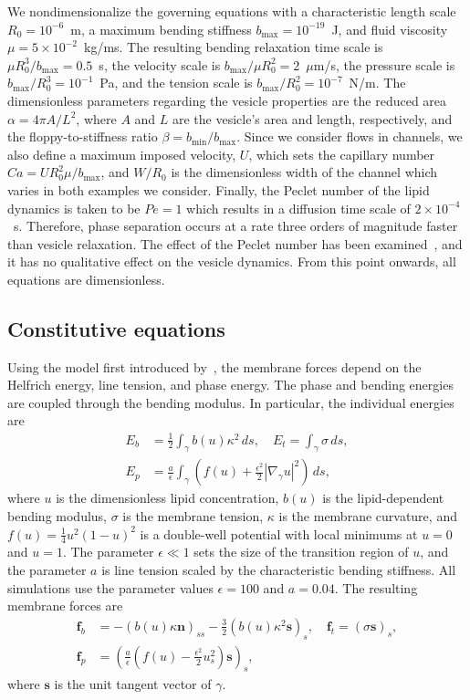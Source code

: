 \documentclass[twoside,twocolumn,9pt]{article}
\newcommand{\ff}{\mathbf{f}}
\newcommand{\nn}{\mathbf{n}}
\renewcommand{\ss}{\mathbf{s}}
\begin{document}
We nondimensionalize the governing equations with a characteristic
length scale $R_0 = 10^{-6}$~m, a maximum bending stiffness $b_{\max} =
10^{-19}$~J, and fluid viscosity $\mu = 5 \times 10^{-2}$~kg/ms. The
resulting bending relaxation time scale is $\mu R_0^3/b_{\max} = 0.5$~s,
the velocity scale is $b_{\max}/\mu R_0^2=2$~$\mu$m/s, the pressure
scale is $b_{\max}/R_0^3 = 10^{-1}$~Pa, and the tension scale is
$b_{\max}/R_0^2 = 10^{-7}$~N/m. The dimensionless parameters regarding
the vesicle properties are the reduced area $\alpha = 4\pi A/L^2$, where
$A$ and $L$ are the vesicle's area and length, respectively, and the
floppy-to-stiffness ratio $\beta = b_{\min}/b_{\max}$. Since we consider
flows in channels, we also define a maximum imposed velocity, $U$, which
sets the capillary number $Ca = U R_{0}^{2} \mu/b_{\max}$, and $W/R_0$
is the dimensionless width of the channel which varies in both examples
we consider. Finally, the Peclet number of the lipid dynamics is taken
to be $Pe = 1$ which results in a diffusion time scale of $2 \times
10^{-4}$~s. Therefore, phase separation occurs at a rate three orders of
magnitude faster than vesicle relaxation. The effect of the Peclet
number has been examined~\cite{liu-mar-li-vee-low2017,
soh-tse-li-voi-low2010}, and it has no qualitative effect on the vesicle
dynamics. From this point onwards, all equations are dimensionless.

\subsection{Constitutive equations\label{subsec:const_eq}}
Using the model first introduced by~\citet{liu-mar-li-vee-low2017}, the
membrane forces depend on the Helfrich energy, line tension, and phase
energy. The phase and bending energies are coupled through the bending
modulus. In particular, the individual energies are
\begin{align}
  E_b &= \frac{1}{2}\int_{\gamma} b(u) \kappa^2 \, ds, \quad
  E_t = \int_{\gamma} \sigma \, ds, \\
  E_p &= \frac{a}{\epsilon}\int_{\gamma}\left(
  f(u) +\frac{\epsilon^2}{2}|\nabla_\gamma u|^2\right) \, ds,
  \label{eqn:PhaseEnergy}
\end{align}
where $u$ is the dimensionless lipid concentration, $b(u)$ is the
lipid-dependent bending modulus, $\sigma$ is the membrane tension,
$\kappa$ is the membrane curvature, and $f(u) = \frac{1}{4}u^2(1-u)^2$
is a double-well potential with local minimums at $u=0$ and $u=1$. The
parameter $\epsilon \ll 1$ sets the size of the transition region of
$u$, and the parameter $a$ is line tension scaled by the characteristic
bending stiffness. All simulations use the parameter values
$\epsilon=100$ and $a=0.04$. The resulting membrane forces are
\begin{align}
  \ff_b &= -(b(u)\kappa \nn)_{ss} -\frac{3}{2}
    \left(b(u) \kappa^2 \ss\right)_s,  \quad
  \ff_t = (\sigma \ss)_s, \\
  \ff_p &= \left(\frac{a}{\epsilon}\left(f(u) -
     \frac{\epsilon^2}{2} u_s^2\right) \ss \right)_s,
\end{align}
where $\ss$ is the unit tangent vector of $\gamma$.
\end{document}
